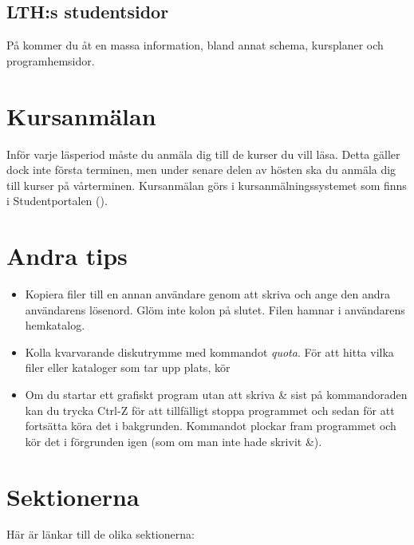 \documentclass[a4paper,twocolumn]{book}
\begin{document}
\subsection{LTH:s studentsidor}

På  kommer du åt en massa information, bland
annat schema, kursplaner och programhemsidor.

\section{Kursanmälan}

Inför varje läsperiod måste du anmäla dig till de kurser du vill läsa. Detta
gäller dock inte första terminen, men under senare delen av hösten ska du
anmäla dig till kurser på vårterminen. Kursanmälan görs i
kursanmälningssystemet som finns i Studentportalen
().


\section{Andra tips}

\begin{itemize}
  \item Kopiera filer till en annan användare genom att skriva  och ange den andra användarens lösenord. Glöm inte
        kolon på slutet. Filen hamnar i användarens hemkatalog.
  \item Kolla kvarvarande diskutrymme med kommandot \emph{quota}. För att hitta
        vilka filer eller kataloger som tar upp plats, kör 
  \item Om du startar ett grafiskt program utan att skriva \& sist på
        kommandoraden kan du trycka Ctrl-Z för att tillfälligt stoppa programmet och
        sedan  för att fortsätta köra det i bakgrunden. Kommandot 
        plockar fram programmet och kör det i förgrunden igen (som om man inte hade
        skrivit \&).
\end{itemize}
\section{Sektionerna}

Här är länkar till de olika sektionerna:
\end{document}
